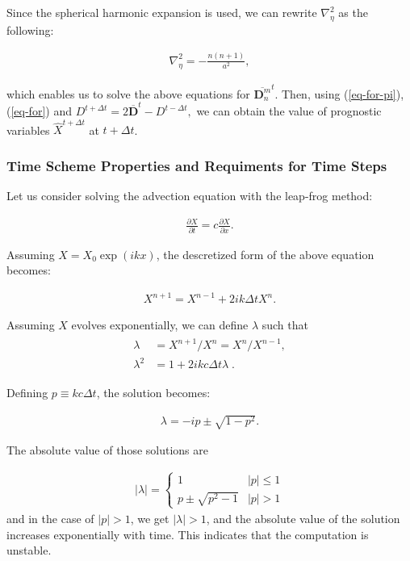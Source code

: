 Since the spherical harmonic expansion is used, we can rewrite \(\nabla_{\eta}^2\) as the following:

\begin{eqnarray}
\nabla_{\eta}^2=-\frac{n(n+1)}{a^2},
\end{eqnarray}

which enables us to solve the above equations for \(\overline{ {\mathbf{D}}_n^m }^{t}\). Then, using (\ref{eq-for-pi}), (\ref{eq-for}) and
\(D^{t+\Delta t} = 2\overline{ {\mathbf{D}} }^{t} - D^{t-\Delta t},\) we can obtain the value of prognostic variables \(\hat{X}^{t+\Delta t}\) at \(t+\Delta t\).

\hypertarget{time-scheme-properties-and-requiments-for-time-steps}{%
\subsubsection{Time Scheme Properties and Requiments for Time Steps}\label{time-scheme-properties-and-requiments-for-time-steps}}

Let us consider solving the advection equation with the leap-frog method:

\begin{eqnarray}
\frac{\partial{X}}{\partial {t}} = c \frac{\partial{X}}{\partial {x}}.
\end{eqnarray}

Assuming \(X = X_0 \exp(ikx)\), the descretized form of the above equation becomes:

\begin{eqnarray}
X^{n+1} = X^{n-1} + 2 i k \Delta t X^n.
\end{eqnarray}

Assuming \(X\) evolves exponentially, we can define \(\lambda\) such that \begin{eqnarray}
\begin{aligned}
\lambda & =  X^{n+1}/X^n = X^n/X^{n-1}, \\
\lambda^2 & =  1 + 2 i kc \Delta t \lambda \; .\end{aligned}
\end{eqnarray}

Defining \(p \equiv kc \Delta t\), the solution becomes:

\begin{eqnarray}
\lambda = -i p \pm \sqrt{1-p^2}.
\end{eqnarray}

The absolute value of those solutions are

\begin{eqnarray}
|\lambda| = \left\{
\begin{array}{ll}
1 & |p| \le 1 \\
p \pm \sqrt{p^2-1} & |p| > 1
\end{array}
\right.
\end{eqnarray} and in the case of \(|p|>1\), we get \(|\lambda| > 1\), and the absolute value of the solution increases exponentially with time. This indicates that the computation is unstable.

